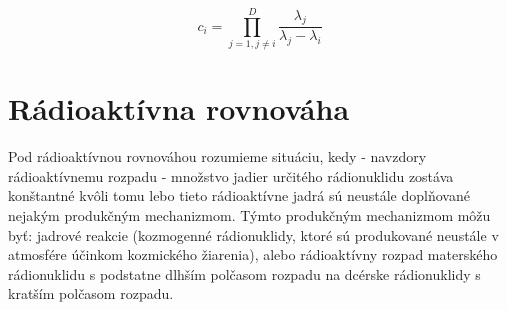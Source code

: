 \documentclass[../../main.tex]{subfiles}
\begin{document}
$$ c_i = \prod_{j=1, j\neq i}^D \frac{\lambda_j}{\lambda_j - \lambda_i} $$

\section{Rádioaktívna rovnováha}
Pod rádioaktívnou rovnováhou rozumieme situáciu, kedy - navzdory rádioaktívnemu rozpadu - množstvo jadier určitého rádionuklidu zostáva konštantné kvôli tomu lebo tieto rádioaktívne jadrá sú neustále doplňované nejakým produkčným mechanizmom. Týmto produkčným mechanizmom môžu byť: jadrové reakcie (kozmogenné rádionuklidy, ktoré sú produkované neustále v atmosfére účinkom kozmického žiarenia), alebo rádioaktívny rozpad materského rádionuklidu s podstatne dlhším polčasom rozpadu na dcérske rádionuklidy s kratším polčasom rozpadu.
\end{document}
